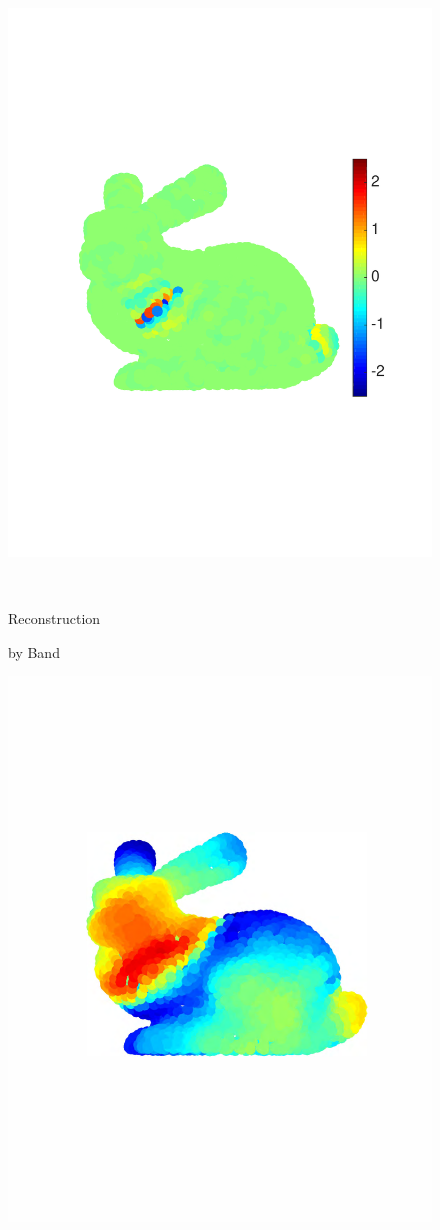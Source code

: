 \documentclass[journal, 10pt]{IEEEtran}
\begin{document}
\begin{figure}[bth]
\begin{minipage}[m]{0.16\linewidth}
\end{minipage}
\begin{minipage}[m]{0.16\linewidth}
\centerline{\includegraphics[width=.85\linewidth]{fig_bunny_coef_wav4}}
\end{minipage}\\
\begin{minipage}[m]{0.16\linewidth}
\centerline{\small{Reconstruction}}
\centerline{\small{by Band}}
\end{minipage}
\begin{minipage}[m]{0.16\linewidth}
\centerline{\includegraphics[width=.8\linewidth]{fig_bunny_rec_scaling}}

\end{minipage}
\end{figure}
\end{document}
